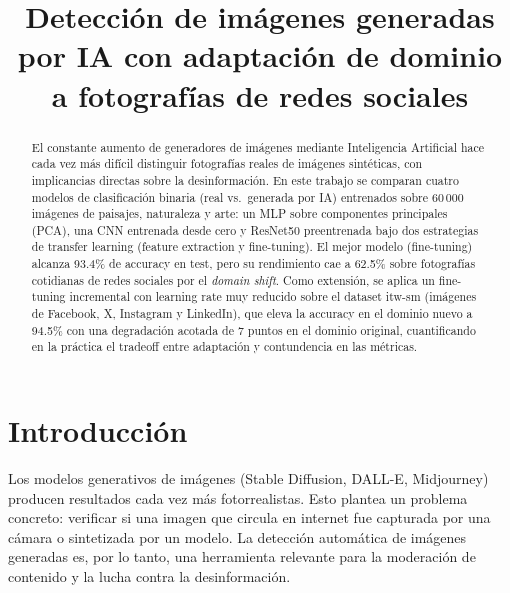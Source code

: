 \documentclass[conference]{IEEEtran}
\begin{document}
\title{Detección de imágenes generadas por IA con adaptación de dominio a fotografías de redes sociales}

\author{
\and
{}
}

\maketitle

\begin{abstract}
El constante aumento de generadores de imágenes mediante Inteligencia Artificial hace cada vez más difícil distinguir fotografías reales de imágenes sintéticas, con implicancias directas sobre la desinformación. En este trabajo se comparan cuatro modelos de clasificación binaria (real vs.\ generada por IA) entrenados sobre 60\,000 imágenes de paisajes, naturaleza y arte: un MLP sobre componentes principales (PCA), una CNN entrenada desde cero y ResNet50 preentrenada bajo dos estrategias de transfer learning (feature extraction y fine-tuning). El mejor modelo (fine-tuning) alcanza 93.4\% de accuracy en test, pero su rendimiento cae a 62.5\% sobre fotografías cotidianas de redes sociales por el \emph{domain shift}. Como extensión, se aplica un fine-tuning incremental con learning rate muy reducido sobre el dataset itw-sm (imágenes de Facebook, X, Instagram y LinkedIn), que eleva la accuracy en el dominio nuevo a 94.5\% con una degradación acotada de 7 puntos en el dominio original, cuantificando en la práctica el tradeoff entre adaptación y contundencia en las métricas.
\end{abstract}

\section{Introducción}

Los modelos generativos de imágenes (Stable Diffusion, DALL-E, Midjourney) producen resultados cada vez más fotorrealistas. Esto plantea un problema concreto: verificar si una imagen que circula en internet fue capturada por una cámara o sintetizada por un modelo. La detección automática de imágenes generadas es, por lo tanto, una herramienta relevante para la moderación de contenido y la lucha contra la desinformación.
\end{document}
